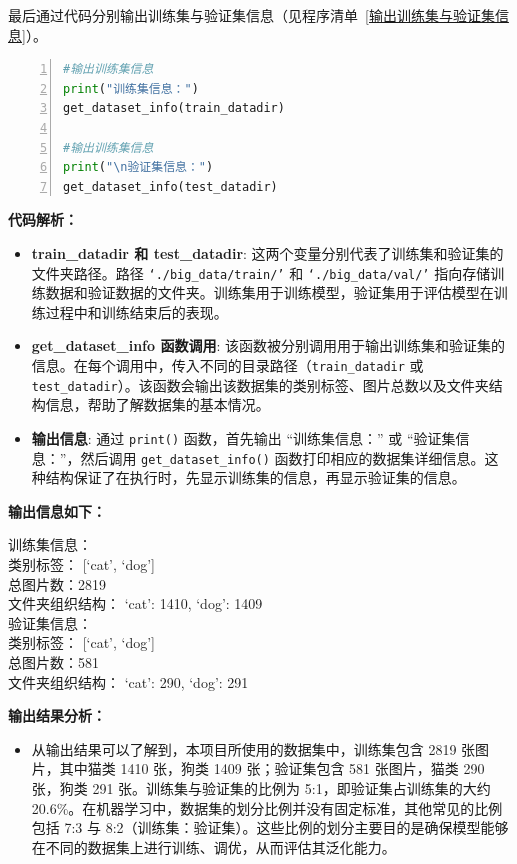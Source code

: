最后通过代码分别输出训练集与验证集信息（见程序清单~\ref{输出训练集与验证集信息}）。
\begin{lstlisting}[language={python},label={输出训练集与验证集信息},caption={输出训练集与验证集信息}, basicstyle=\footnotesize\ttfamily, breaklines=true, numbers=left, frame=single,keepspaces=true,showstringspaces=false]
#输出训练集信息
print("训练集信息：")
get_dataset_info(train_datadir)

#输出训练集信息
print("\n验证集信息：")
get_dataset_info(test_datadir)
\end{lstlisting}
\textbf{代码解析：}

\begin{itemize} 
    \item \textbf{train\_datadir 和 test\_datadir}: 这两个变量分别代表了训练集和验证集的文件夹路径。路径 \texttt{‘./big\_data/train/’} 和 \texttt{‘./big\_data/val/’} 指向存储训练数据和验证数据的文件夹。训练集用于训练模型，验证集用于评估模型在训练过程中和训练结束后的表现。 

    \item \textbf{get\_dataset\_info 函数调用}: 该函数被分别调用用于输出训练集和验证集的信息。在每个调用中，传入不同的目录路径（\texttt{train\_datadir} 或 \texttt{test\_datadir}）。该函数会输出该数据集的类别标签、图片总数以及文件夹结构信息，帮助了解数据集的基本情况。 

    \item \textbf{输出信息}: 通过 \texttt{print()} 函数，首先输出 “训练集信息：” 或 “验证集信息：”，然后调用 \texttt{get\_dataset\_info()} 函数打印相应的数据集详细信息。这种结构保证了在执行时，先显示训练集的信息，再显示验证集的信息。 
\end{itemize}

\textbf{输出信息如下：}
\vspace{-3mm} %
\begin{tcolorbox}[colframe=blue!50!black, colback=blue!10!white, coltitle=black, sharp corners, top=0mm, bottom=0mm, boxrule=0.8mm]
训练集信息：\\
类别标签： [‘cat’, ‘dog’] \\
总图片数：2819 \\
文件夹组织结构： {‘cat’: 1410, ‘dog’: 1409} \\

验证集信息：\\
类别标签： [‘cat’, ‘dog’] \\
总图片数：581 \\
文件夹组织结构： {‘cat’: 290, ‘dog’: 291}
\end{tcolorbox}
\vspace{-3mm} %
\textbf{输出结果分析：}
\begin{itemize}
    \item 从输出结果可以了解到，本项目所使用的数据集中，训练集包含 2819 张图片，其中猫类 1410 张，狗类 1409 张；验证集包含 581 张图片，猫类 290 张，狗类 291 张。训练集与验证集的比例为 5:1，即验证集占训练集的大约 20.6\%。在机器学习中，数据集的划分比例并没有固定标准，其他常见的比例包括 7:3 与 8:2（训练集：验证集）。这些比例的划分主要目的是确保模型能够在不同的数据集上进行训练、调优，从而评估其泛化能力。
\end{itemize}
